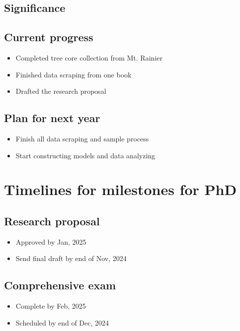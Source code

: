 \documentclass[11pt,letter]{article}
\begin{document}
\subsection{Significance}
\subsection{Current progress} %
 \begin{itemize}
 	\item Completed tree core collection from Mt. Rainier %
 	\item Finished data scraping from one book
 	\item Drafted the research proposal
 \end{itemize}
\subsection{Plan for next year}
 \begin{itemize}
 	\item Finish all data scraping and sample process
 	\item Start constructing models and data analyzing
 \end{itemize}
\section{Timelines for milestones for PhD} %
\subsection{Research proposal}
 \begin{itemize}
	\item Approved by Jan, 2025 %
	\item Send final draft by end of Nov, 2024
	\end{itemize}
\subsection{Comprehensive exam}
 \begin{itemize}
	\item Complete by Feb, 2025  %
	\item Scheduled by end of Dec, 2024 %
	\end{itemize}
\end{document}
